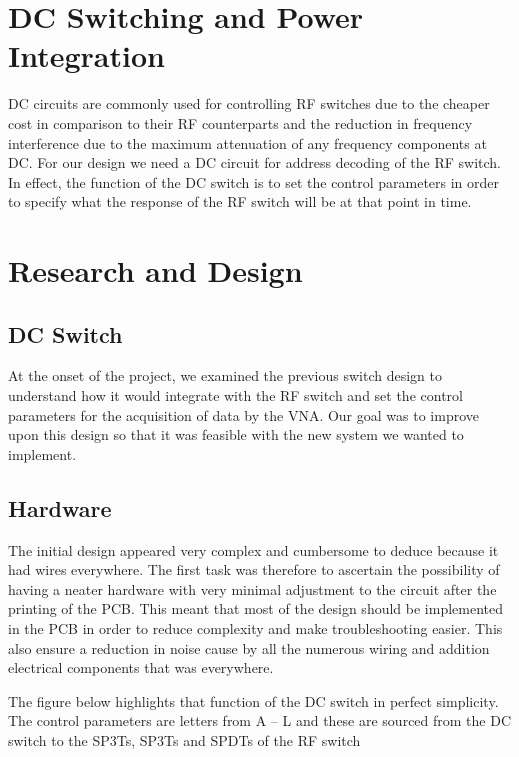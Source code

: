 \section{DC Switching and Power Integration}

DC circuits are commonly used for controlling RF switches due to the cheaper cost in comparison to their RF counterparts and the reduction in frequency interference due to the maximum attenuation of any frequency components at DC. For our design we need a DC circuit for address decoding of the RF switch. In effect, the function of the DC switch is to set the control parameters in order to specify what the response of the RF switch will be at that point in time. 

\section{Research and Design}

\subsection{DC Switch}

At the onset of the project, we examined the previous switch design to understand how it would integrate with the RF switch and set the control parameters for the acquisition of data by the VNA. Our goal was to improve upon this design so that it was feasible with the new system we wanted to implement.

\subsection{Hardware}

The initial design appeared very complex and cumbersome to deduce because it had wires everywhere. The first task was therefore to ascertain the possibility of having a neater hardware with very minimal adjustment to the circuit after the printing of the PCB. This meant that most of the design should be implemented in the PCB in order to reduce complexity and make troubleshooting easier. This also ensure a reduction in noise cause by all the numerous wiring and addition electrical components that was everywhere.

The figure below highlights that function of the DC switch in perfect simplicity. The control parameters are letters from A – L and these are sourced from the DC switch to the SP3Ts, SP3Ts and SPDTs of the RF switch




